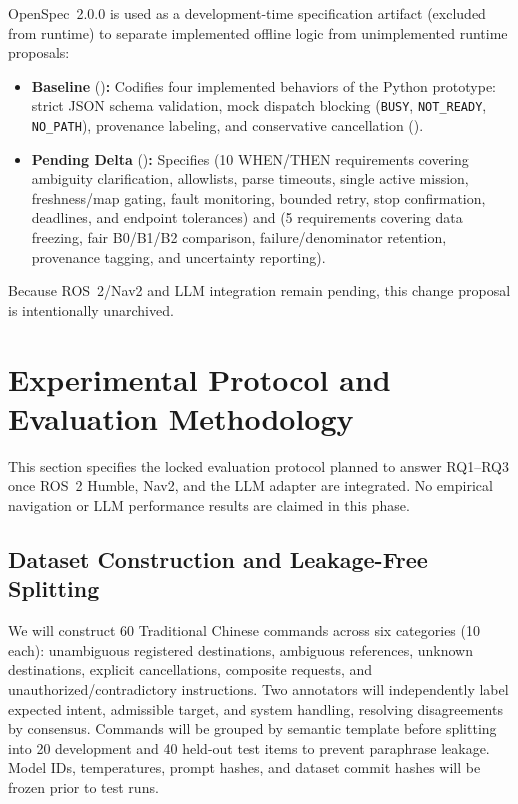 \documentclass[conference,a4paper]{IEEEtran}
\begin{document}
OpenSpec~2.0.0 is used as a development-time specification artifact (excluded from runtime) to separate implemented offline logic from unimplemented runtime proposals:
\begin{itemize}
    \item \textbf{Baseline} ()\textbf{:} Codifies four implemented behaviors of the Python prototype: strict JSON schema validation, mock dispatch blocking (\texttt{BUSY}, \texttt{NOT\_READY}, \texttt{NO\_PATH}),  provenance labeling, and conservative cancellation ().
    \item \textbf{Pending Delta} ()\textbf{:} Specifies  (10 WHEN/THEN requirements covering ambiguity clarification, allowlists, parse timeouts, single active mission, freshness/map gating, fault monitoring, bounded retry, stop confirmation, deadlines, and endpoint tolerances) and  (5 requirements covering data freezing, fair B0/B1/B2 comparison, failure/denominator retention, provenance tagging, and uncertainty reporting).
\end{itemize}
Because ROS~2/Nav2 and LLM integration remain pending, this change proposal is intentionally unarchived.

\FloatBarrier

\section{Experimental Protocol and Evaluation Methodology}

This section specifies the locked evaluation protocol planned to answer RQ1--RQ3 once ROS~2 Humble, Nav2, and the LLM adapter are integrated. No empirical navigation or LLM performance results are claimed in this phase.

\subsection{Dataset Construction and Leakage-Free Splitting}

We will construct 60 Traditional Chinese commands across six categories (10 each): unambiguous registered destinations, ambiguous references, unknown destinations, explicit cancellations, composite requests, and unauthorized/contradictory instructions. Two annotators will independently label expected intent, admissible target, and system handling, resolving disagreements by consensus. Commands will be grouped by semantic template before splitting into 20 development and 40 held-out test items to prevent paraphrase leakage. Model IDs, temperatures, prompt hashes, and dataset commit hashes will be frozen prior to test runs.
\end{document}
